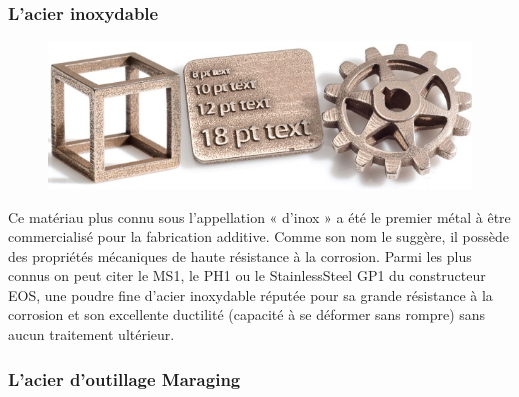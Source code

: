 \documentclass{article}
\begin{document}
\subsubsection{L'acier inoxydable}
\begin{figure}[h!]
\centering
\includegraphics[scale=0.4]{./images/acier-inoxydable.png}
\end{figure}\hfill
 \par\leavevmode\par
Ce matériau plus connu sous l'appellation « d'inox » a été le premier métal à être commercialisé pour la fabrication additive. Comme son nom le suggère, il possède des propriétés mécaniques de haute résistance à la corrosion. Parmi les plus connus on peut citer le MS1, le PH1 ou le StainlessSteel GP1 du constructeur EOS, une poudre fine d'acier inoxydable réputée pour sa grande résistance à la corrosion et son excellente ductilité (capacité à se déformer sans rompre) sans aucun traitement ultérieur.\hfill
 \par\leavevmode\par
{}

\subsubsection{L'acier d'outillage Maraging}
\end{document}
